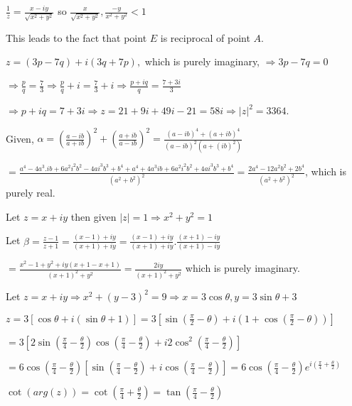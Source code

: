   $\frac{1}{z} = \frac{x - iy}{\sqrt{x^2 + y^2}}$ so $\frac{x}{\sqrt{x^2 + y^2}}, \frac{-y}{x^2 + y^2}< 1$

  This leads to the fact that point $E$ is reciprocal of point $A$.
\item $z = (3p - 7q) + i(3q + 7p),$ which is purely imaginary, $\Rightarrow 3p - 7q = 0$

  $\Rightarrow \frac{p}{q} = \frac{7}{3} \Rightarrow \frac{p}{q} + i = \frac{7}{3} + i \Rightarrow \frac{p +
  iq}{q} = \frac{7 + 3i}{3}$

  $\Rightarrow p+ iq = 7 + 3i \Rightarrow z = 21 + 9i + 49i - 21 = 58i \Rightarrow |z|^2 = 3364$.
\item Given, $\alpha = \left(\frac{a - ib}{a + ib}\right)^2 + \left(\frac{a + ib}{a - ib}\right)^2 =
  \frac{(a - ib)^4 + (a + ib)^4}{(a - ib)^2(a + (ib)^2)}$

  $= \frac{a^4 - 4a^3.ib + 6a^2i^2b^2 - 4ai^3b^3 + b^4 + a^4 + 4a^3ib + 6a^2i^2b^2 + 4ai^3b^3 + b^4}{(a^2 +
    b^2)^2} = \frac{2a^4 - 12a^2b^2 + 2b^4}{(a^2 + b^2)^2}$, which is purely real.
\item Let $z = x + iy$ then given $|z| = 1 \Rightarrow x^2 + y^2 = 1$

  Let $\beta = \frac{z - 1}{z + 1} = \frac{(x - 1) + iy}{(x + 1) + iy} = \frac{(x - 1) + iy}{(x + 1) +
  iy}.\frac{(x + 1) - iy}{(x + 1) - iy}$

  $= \frac{x^2 - 1 + y^2 + iy(x + 1 -x + 1)}{(x + 1)^2 + y^2} = \frac{2iy}{(x + 1)^2 + y^2}$ which is purely
  imaginary.
\item Let $z = x + iy \Rightarrow x^2 + (y - 3)^2 = 9 \Rightarrow x = 3\cos\theta, y = 3\sin\theta + 3$

  $z = 3[\cos\theta + i(\sin\theta + 1)] = 3\left[\sin\left(\frac{\pi}{2} - \theta\right) + i\left(1 +
  \cos\left(\frac{\pi}{2} - \theta\right)\right)\right]$

  $= 3\left[2\sin\left(\frac{\pi}{4} - \frac{\theta}{2}\right)\cos\left(\frac{\pi}{4} -
  \frac{\theta}{2}\right) + i2\cos^2\left(\frac{\pi}{4} - \frac{\theta}{2}\right)\right]$

  $= 6\cos\left(\frac{\pi}{4} - \frac{\theta}{2}\right)\left[\sin\left(\frac{\pi}{4} -
  \frac{\theta}{2}\right) + i\cos\left(\frac{\pi}{4} - \frac{\theta}{2}\right)\right]
  = 6\cos\left(\frac{\pi}{4} - \frac{\theta}{2}\right)e^{i\left(\frac{\pi}{4} + \frac{\theta}{2}\right)}$

  $\cot\left(arg(z)\right) = \cot\left(\frac{\pi}{4} + \frac{\theta}{2}\right) = \tan\left(\frac{\pi}{4} -
  \frac{\theta}{2}\right)$

